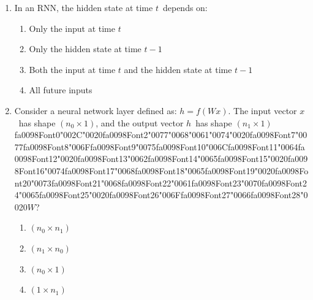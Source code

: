 \documentclass[12pt]{article}
\begin{document}
\begin{enumerate}[label=Q\arabic*.]
\item In an RNN, the hidden state at time $t$\ depends on:
\begin{enumerate}[label=(\Alph*)]
    \item Only the input at time $t$
    \item Only the hidden state at time $t-1$
    \item Both the input at time $t$ and the hidden state at time $t-1$
    \item All future inputs
\end{enumerate}
\item Consider a neural network layer defined as: $h = f(Wx)$. The input vector $x$\ has shape $(n_0 \times 1)$, and the output vector $h$\ has shape $(n_1 \times 1)${\csname fa0098Font0\endcsname\char"002C}{\char"0020}{\csname fa0098Font2\endcsname\char"0077}{\char"0068}{\char"0061}{\char"0074}{\char"0020}{\csname fa0098Font7\endcsname\char"0077}{\csname fa0098Font8\endcsname\char"006F}{\csname fa0098Font9\endcsname\char"0075}{\csname fa0098Font10\endcsname\char"006C}{\csname fa0098Font11\endcsname\char"0064}{\csname fa0098Font12\endcsname\char"0020}{\csname fa0098Font13\endcsname\char"0062}{\csname fa0098Font14\endcsname\char"0065}{\csname fa0098Font15\endcsname\char"0020}{\csname fa0098Font16\endcsname\char"0074}{\csname fa0098Font17\endcsname\char"0068}{\csname fa0098Font18\endcsname\char"0065}{\csname fa0098Font19\endcsname\char"0020}{\csname fa0098Font20\endcsname\char"0073}{\csname fa0098Font21\endcsname\char"0068}{\csname fa0098Font22\endcsname\char"0061}{\csname fa0098Font23\endcsname\char"0070}{\csname fa0098Font24\endcsname\char"0065}{\csname fa0098Font25\endcsname\char"0020}{\csname fa0098Font26\endcsname\char"006F}{\csname fa0098Font27\endcsname\char"0066}{\csname fa0098Font28\endcsname\char"0020}$W$?
\begin{enumerate}[label=(\Alph*)]
    \item $(n_0 \times n_1)$
    \item $(n_1 \times n_0)$
    \item $(n_0 \times 1)$
    \item $(1 \times n_1)$
\end{enumerate}

\end{enumerate}
\end{document}
